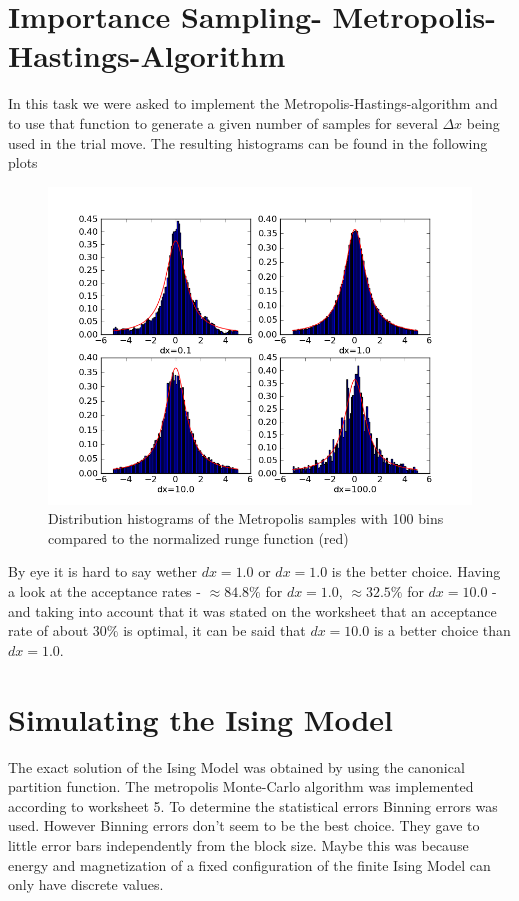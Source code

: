 \documentclass[12pt,a4paper]{scrartcl}
\begin{document}
\section{Importance Sampling- Metropolis-Hastings-Algorithm}
In this task we were asked to implement the Metropolis-Hastings-algorithm and to use that function to generate a given number of samples for several $\Delta x$ being used in the trial move.
The resulting histograms can be found in the following plots
 \begin{figure}[H]
\centering
\includegraphics[width=16.0cm]{../plots/hist.png}
\caption{Distribution histograms of the Metropolis samples with 100 bins compared to the normalized runge function (red)}
\label{fig:runge}
\end{figure}
By eye it is hard to say wether $dx = 1.0$ or $dx= 1.0$ is the better choice. Having a look at the acceptance rates - $\approx 84.8\%$ for $ dx=1.0$, $\approx 32.5\%$ for $dx=10.0$  -and taking into account that it was stated on the worksheet that an acceptance rate of about $30\%$ is optimal, it can be said that $dx = 10.0 $ is a better choice than $dx= 1.0$.

\section{Simulating the Ising Model}

The exact solution of the Ising Model was obtained by using the canonical partition function. The metropolis Monte-Carlo algorithm was implemented according to worksheet 5. To determine the statistical errors Binning errors was used. However Binning errors don't seem to be the best choice. They gave to little error bars independently from the block size. Maybe this was because energy and magnetization of a fixed configuration of the finite Ising Model can only have discrete values.
\end{document}
